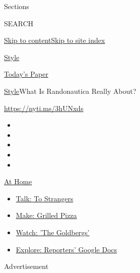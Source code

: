 Sections

SEARCH

\protect\hyperlink{site-content}{Skip to
content}\protect\hyperlink{site-index}{Skip to site index}

\href{https://www.nytimes3xbfgragh.onion/section/style}{Style}

\href{https://myaccount.nytimes3xbfgragh.onion/auth/login?response_type=cookie\&client_id=vi}{}

\href{https://www.nytimes3xbfgragh.onion/section/todayspaper}{Today's
Paper}

\href{/section/style}{Style}\textbar{}What Is Randonautica Really About?

\url{https://nyti.ms/3hUNxds}

\begin{itemize}
\item
\item
\item
\item
\item
\end{itemize}

\href{https://www.nytimes3xbfgragh.onion/spotlight/at-home?action=click\&pgtype=Article\&state=default\&region=TOP_BANNER\&context=at_home_menu}{At
Home}

\begin{itemize}
\tightlist
\item
  \href{https://www.nytimes3xbfgragh.onion/2020/08/03/well/family/the-benefits-of-talking-to-strangers.html?action=click\&pgtype=Article\&state=default\&region=TOP_BANNER\&context=at_home_menu}{Talk:
  To Strangers}
\item
  \href{https://www.nytimes3xbfgragh.onion/2020/08/01/at-home/coronavirus-make-pizza-on-a-grill.html?action=click\&pgtype=Article\&state=default\&region=TOP_BANNER\&context=at_home_menu}{Make:
  Grilled Pizza}
\item
  \href{https://www.nytimes3xbfgragh.onion/2020/07/31/arts/television/goldbergs-abc-stream.html?action=click\&pgtype=Article\&state=default\&region=TOP_BANNER\&context=at_home_menu}{Watch:
  'The Goldbergs'}
\item
  \href{https://www.nytimes3xbfgragh.onion/interactive/2020/at-home/even-more-reporters-editors-diaries-lists-recommendations.html?action=click\&pgtype=Article\&state=default\&region=TOP_BANNER\&context=at_home_menu}{Explore:
  Reporters' Google Docs}
\end{itemize}

Advertisement

